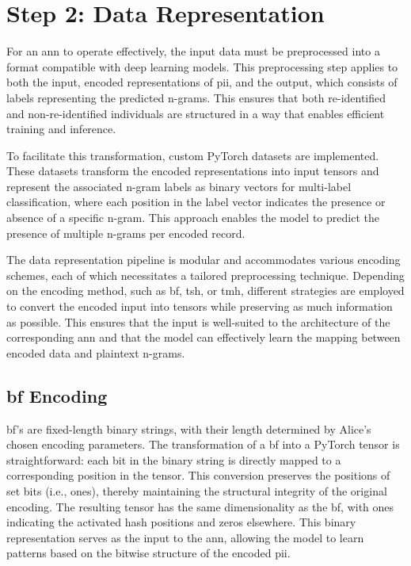 \section{Step 2: Data Representation} \label{sec:representation}

For an \ac{ann} to operate effectively, the input data must be preprocessed into a format compatible with deep learning models.
This preprocessing step applies to both the input, encoded representations of \ac{pii}, and the output, which consists of labels representing the predicted n-grams.
This ensures that both re-identified and non-re-identified individuals are structured in a way that enables efficient training and inference.

To facilitate this transformation, custom PyTorch datasets are implemented.
These datasets transform the encoded representations into input tensors and represent the associated n-gram labels as binary vectors for multi-label classification, where each position in the label vector indicates the presence or absence of a specific n-gram.
This approach enables the model to predict the presence of multiple n-grams per encoded record.

The data representation pipeline is modular and accommodates various encoding schemes, each of which necessitates a tailored preprocessing technique.
Depending on the encoding method, such as \ac{bf}, \ac{tsh}, or \ac{tmh}, different strategies are employed to convert the encoded input into tensors while preserving as much information as possible.
This ensures that the input is well-suited to the architecture of the corresponding \ac{ann} and that the model can effectively learn the mapping between encoded data and plaintext n-grams.

\subsection{\ac{bf} Encoding}

\ac{bf}'s are fixed-length binary strings, with their length determined by Alice’s chosen encoding parameters.
The transformation of a \ac{bf} into a PyTorch tensor is straightforward: each bit in the binary string is directly mapped to a corresponding position in the tensor.
This conversion preserves the positions of set bits (i.e., ones), thereby maintaining the structural integrity of the original encoding.
The resulting tensor has the same dimensionality as the \ac{bf}, with ones indicating the activated hash positions and zeros elsewhere.
This binary representation serves as the input to the \ac{ann}, allowing the model to learn patterns based on the bitwise structure of the encoded \ac{pii}.

